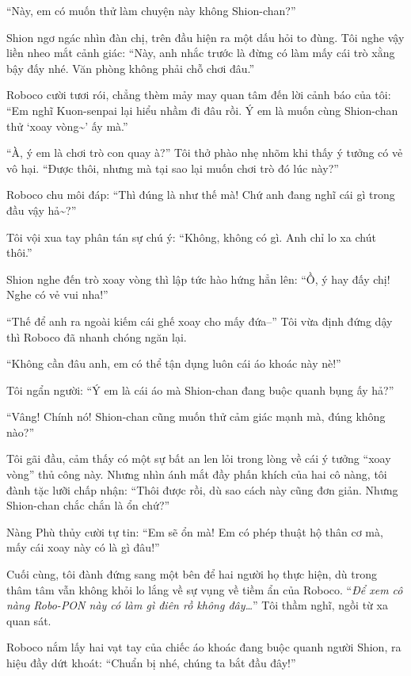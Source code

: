 \documentclass[../main.tex]{subfiles}
\begin{document}
``Này, em có muốn thử làm chuyện này không Shion-chan?''

Shion ngơ ngác nhìn đàn chị, trên đầu hiện ra một dấu hỏi to đùng. Tôi nghe vậy liền nheo mắt cảnh giác: ``Này, anh nhắc trước là đừng có làm mấy cái trò xằng bậy đấy nhé. Văn phòng không phải chỗ chơi đâu.''


Roboco cười tươi rói, chẳng thèm mảy may quan tâm đến lời cảnh báo của tôi: ``Em nghĩ Kuon-senpai lại hiểu nhầm đi đâu rồi. Ý em là muốn cùng Shion-chan thử `xoay vòng\~{}' ấy mà.''

``À, ý em là chơi trò con quay à?'' Tôi thở phào nhẹ nhõm khi thấy ý tưởng có vẻ vô hại. ``Được thôi, nhưng mà tại sao lại muốn chơi trò đó lúc này?''

Roboco chu môi đáp: ``Thì đúng là như thế mà! Chứ anh đang nghĩ cái gì trong đầu vậy hả\~{}?''

Tôi vội xua tay phân tán sự chú ý: ``Không, không có gì. Anh chỉ lo xa chút thôi.''

Shion nghe đến trò xoay vòng thì lập tức hào hứng hẳn lên: ``Ồ, ý hay đấy chị! Nghe có vẻ vui nha!''

``Thế để anh ra ngoài kiếm cái ghế xoay cho mấy đứa--'' Tôi vừa định đứng dậy thì Roboco đã nhanh chóng ngăn lại.

``Không cần đâu anh, em có thể tận dụng luôn cái áo khoác này nè!''

Tôi ngẩn người: ``Ý em là cái áo mà Shion-chan đang buộc quanh bụng ấy hả?''

``Vâng! Chính nó! Shion-chan cũng muốn thử cảm giác mạnh mà, đúng không nào?''

Tôi gãi đầu, cảm thấy có một sự bất an len lỏi trong lòng về cái ý tưởng ``xoay vòng'' thủ công này. Nhưng nhìn ánh mắt đầy phấn khích của hai cô nàng, tôi đành tặc lưỡi chấp nhận: ``Thôi được rồi, dù sao cách này cũng đơn giản. Nhưng Shion-chan chắc chắn là ổn chứ?''

Nàng Phù thủy cười tự tin: ``Em sẽ ổn mà! Em có phép thuật hộ thân cơ mà, mấy cái xoay này có là gì đâu!''

Cuối cùng, tôi đành đứng sang một bên để hai người họ thực hiện, dù trong thâm tâm vẫn không khỏi lo lắng về sự vụng về tiềm ẩn của Roboco. ``\textit{Để xem cô nàng Robo-PON này có làm gì điên rồ không đây\dots}'' Tôi thầm nghĩ, ngồi từ xa quan sát.


Roboco nắm lấy hai vạt tay của chiếc áo khoác đang buộc quanh người Shion, ra hiệu đầy dứt khoát: ``Chuẩn bị nhé, chúng ta bắt đầu đây!''
\end{document}
